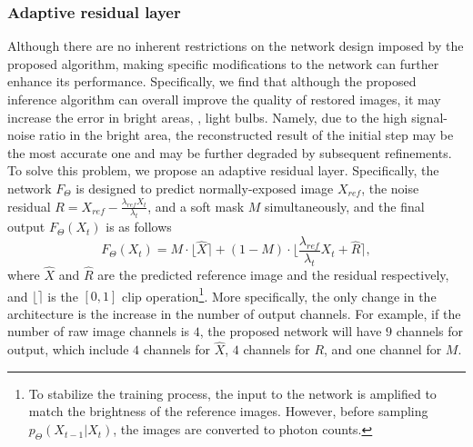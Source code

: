 \documentclass[10pt,twocolumn,letterpaper]{article}
\def\p{p_\Theta}
\def\F{F_{\Theta}}
\begin{document}
\subsubsection{Adaptive residual layer}
Although there are no inherent restrictions on the network design imposed by the proposed algorithm, making specific modifications to the network can further enhance its performance.
Specifically, we find that although the proposed inference algorithm can overall improve the quality of restored images, it may increase the error in bright areas, \eg, light bulbs. Namely, due to the high signal-noise ratio in the bright area, the reconstructed result of the initial step may be the most accurate one and may be further degraded by subsequent refinements. To solve this problem, we propose an adaptive residual layer. Specifically, the network $\F$ is designed to predict normally-exposed image $X_{ref}$, the noise residual $R=X_{ref}-\frac{\lambda_{ref}X_t}{\lambda_t}$, and a soft mask $M$ simultaneously, and the final output $\F(X_t)$ is as follows
\begin{equation}
    \F(X_t) = M \cdot \lfloor \hat{X} \rceil + (1-M) \cdot \lfloor\frac{\lambda_{ref}}{\lambda_t} X_t+\hat{R}\rceil, 
\label{eq:ARL}
\end{equation}
where $\hat{X}$ and $\hat{R}$ are the predicted reference image and the residual respectively, and $\lfloor \rceil$ is the $[0, 1]$ clip operation\footnote{To stabilize the training process, the input to the network is amplified to match the brightness of the reference images. However, before sampling $\p(X_{t-1}|X_t)$, the images are converted to photon counts.}. More specifically, the only change in the architecture is the increase in the number of output channels. For example, if the number of raw image channels is $4$, the proposed network will have $9$ channels for output, which include $4$ channels for $\hat{X}$, $4$ channels for $R$, and one channel for $M$.
\end{document}
